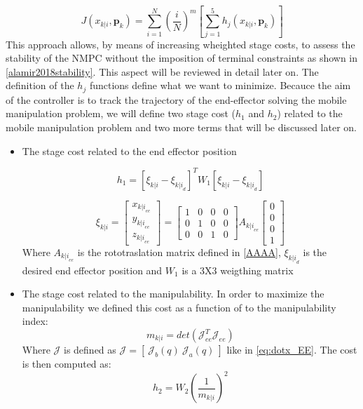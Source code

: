 \begin{equation}
J({x}_{k|i},\textbf{p}_k)=\sum_{i=1}^{N}\left(\frac{i}{N}\right)^m \left[ \sum_{j=1}^{5} h_j({x}_{k|i},\textbf{p}_k) \right]
\end{equation} 
This approach allows, by means of increasing wheighted stage costs, to assess the stability of the NMPC without the imposition of terminal constraints as shown in \ref{alamir2018stability}. This aspect will be reviewed in detail later on.
The definition of the $h_j$ functions define what we want to minimize. Becauce the aim of the controller is to track the trajectory of the end-effector solving the mobile manipulation problem, we will define two stage cost ($h_1$ and $h_2$) related to the mobile manipulation problem and two more terms that will be discussed later on.  

\begin{itemize}

\item The stage cost related to the end effector position

\begin{equation}
	h_1 = [\xi_{k|i}-\xi_{{k|i}_{d}}]^T W_1[\xi_{k|i}-\xi_{{k|i}_{d}}]
\end{equation}

\begin{equation} 
 \xi_{k|i} = \left[ \begin{matrix} x_{{k|i}_{ee}} \\ y_{{k|i}_{ee}} \\ z_{{k|i}_{ee}} 
\end{matrix} \right] = \left[ \begin{matrix}
1 & 0 & 0 & 0 \\ 0 & 1 & 0 & 0 \\ 0 & 0 & 1 & 0
\end{matrix} \right]A_{{k|i}_{ee}}\left[ \begin{matrix}
0 \\ 0 \\ 0 \\ 1
\end{matrix} \right]%
\end{equation} 
Where $A_{{k|i}_{ee}}$ is the rototraslation matrix defined in \ref{AAAA}, $\xi_{{k|i}_{d}}$ is the desired end effector position and $W_1$ is a 3X3 weigthing matrix

\item The stage cost related to the manipulability. In order to maximize the manipulability we defined this cost as a function of to the manipulability index:
\begin{equation}
m_{k|i} =  det(\mathcal{J}_{ee}^T\mathcal{J}_{ee})
\end{equation}
Where $\mathcal{J}$ is defined as $\mathcal{J}=[\ \mathcal{J}_b(q)\ \mathcal{J}_a(q)\ ]$ like in \ref{eq:dotx_EE}. The cost is then computed as: 
\begin{equation}
	h_2 = W_2 \left( \frac{1}{m_{k|i}} \right)^2
\end{equation}
    

\end{itemize}
